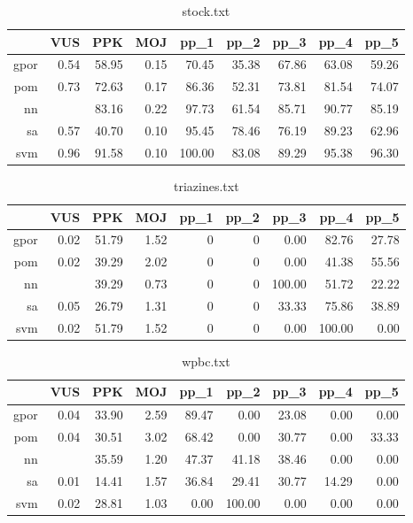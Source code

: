 \documentclass{mini}
\begin{document}
\begin{table}[ht]
\centering
\begin{tabular}{rrrrrrrrr}
\hline
& VUS & PPK & MOJ & pp\_1 & pp\_2 & pp\_3 & pp\_4 & pp\_5 \\
\hline
gpor & 0.54 & 58.95 & 0.15 & 70.45 & 35.38 & 67.86 & 63.08 & 59.26 \\
pom & 0.73 & 72.63 & 0.17 & 86.36 & 52.31 & 73.81 & 81.54 & 74.07 \\
nn & & 83.16 & 0.22 & 97.73 & 61.54 & 85.71 & 90.77 & 85.19 \\
sa & 0.57 & 40.70 & 0.10 & 95.45 & 78.46 & 76.19 & 89.23 & 62.96 \\
svm & 0.96 & 91.58 & 0.10 & 100.00 & 83.08 & 89.29 & 95.38 & 96.30 \\
\hline
\end{tabular}
\caption{stock.txt}
\end{table}
\begin{table}[ht]
\centering
\begin{tabular}{rrrrrrrrr}
\hline
& VUS & PPK & MOJ & pp\_1 & pp\_2 & pp\_3 & pp\_4 & pp\_5 \\
\hline
gpor & 0.02 & 51.79 & 1.52 & 0 & 0 & 0.00 & 82.76 & 27.78 \\
pom & 0.02 & 39.29 & 2.02 & 0 & 0 & 0.00 & 41.38 & 55.56 \\
nn & & 39.29 & 0.73 & 0 & 0 & 100.00 & 51.72 & 22.22 \\
sa & 0.05 & 26.79 & 1.31 & 0 & 0 & 33.33 & 75.86 & 38.89 \\
svm & 0.02 & 51.79 & 1.52 & 0 & 0 & 0.00 & 100.00 & 0.00 \\
\hline
\end{tabular}
\caption{triazines.txt}
\end{table}
\begin{table}[ht]
\centering
\begin{tabular}{rrrrrrrrr}
\hline
& VUS & PPK & MOJ & pp\_1 & pp\_2 & pp\_3 & pp\_4 & pp\_5 \\
\hline
gpor & 0.04 & 33.90 & 2.59 & 89.47 & 0.00 & 23.08 & 0.00 & 0.00 \\
pom & 0.04 & 30.51 & 3.02 & 68.42 & 0.00 & 30.77 & 0.00 & 33.33 \\
nn & & 35.59 & 1.20 & 47.37 & 41.18 & 38.46 & 0.00 & 0.00 \\
sa & 0.01 & 14.41 & 1.57 & 36.84 & 29.41 & 30.77 & 14.29 & 0.00 \\
svm & 0.02 & 28.81 & 1.03 & 0.00 & 100.00 & 0.00 & 0.00 & 0.00 \\
\hline
\end{tabular}
\caption{wpbc.txt}
\end{table}
\end{document}
